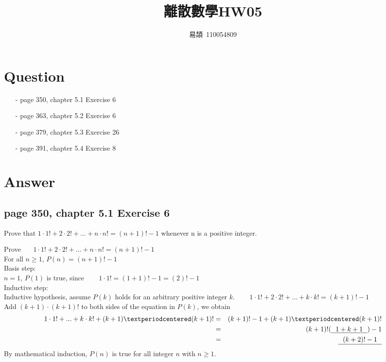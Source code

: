 \documentclass[sigconf]{acmart}
\begin{document}
\title{離散數學HW05}

\author{易頡~110054809}
\orcid{}

\renewcommand\footnotetextcopyrightpermission[1]{} %
\pagestyle{plain} %

\maketitle

\section{Question}
\begin{itemize}
	\item[-] page 350, chapter 5.1 Exercise 6
	\item[-] page 363, chapter 5.2 Exercise 6
	\item[-] page 379, chapter 5.3 Exercise 26 
	\item[-] page 391, chapter 5.4 Exercise 8
\end{itemize}

\section{Answer}
\subsection{page 350, chapter 5.1 Exercise 6}
\begin{shaded}
    Prove that $1 \cdot 1! + 2 \cdot 2! + ... + n \cdot n! = (n + 1)! - 1$ whenever n is a positive integer.
\end{shaded}  
Prove ~~~$1 \cdot 1! + 2 \cdot 2! + ... + n \cdot n! = (n + 1)! - 1$ \\
For all $n \geq 1 $, $ P(n) = (n + 1)! - 1 $ \\
Basis step:\\
$n = 1$, $ P(1) $ is true, since ~~~ $ 1 \cdot 1! = (1 + 1)! - 1 = (2)! - 1 $ \\
Inductive step:\\
Inductive hypothesis, assume $ P(k) $ holds for an arbitrary positive integer $k$. ~~~  $1 \cdot 1! + 2 \cdot 2! + ... + k \cdot k! = (k + 1)! - 1 $\\
Add $ (k + 1) \cdot (k + 1)!$ to both sides of the equation in $ P(k) $, we obtain
\begin{eqnarray*}
1 \cdot 1!  + ... + k \cdot k! + (k + 1) · (k + 1)!  & = & (k + 1)! - 1 + (k + 1) · (k + 1)!\\
~ & = & (k + 1)!(\uline{~~1+k+1~~}) - 1 \\
~ & = & \uline{~~(k+2)!-1~~} 
\end{eqnarray*}
By mathematical induction, $ P(n) $ is true for all integer $n$ with $n \geq 1 $.
\end{document}
